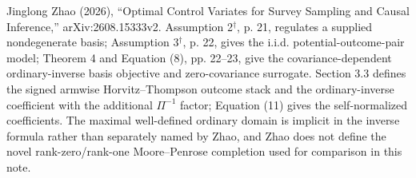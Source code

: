 Jinglong Zhao (2026), ``Optimal Control Variates for Survey Sampling and Causal Inference,'' arXiv:2608.15333v2.  Assumption 2\(^{\dagger}\), p. 21, regulates a supplied nondegenerate basis; Assumption 3\(^{\dagger}\), p. 22, gives the i.i.d. potential-outcome-pair model; Theorem 4 and Equation (8), pp. 22--23, give the covariance-dependent ordinary-inverse basis objective and zero-covariance surrogate.  Section 3.3 defines the signed armwise Horvitz--Thompson outcome stack and the ordinary-inverse coefficient with the additional \(\Pi^{-1}\) factor; Equation (11) gives the self-normalized coefficients.  The maximal well-defined ordinary domain is implicit in the inverse formula rather than separately named by Zhao, and Zhao does not define the novel rank-zero/rank-one Moore--Penrose completion used for comparison in this note.